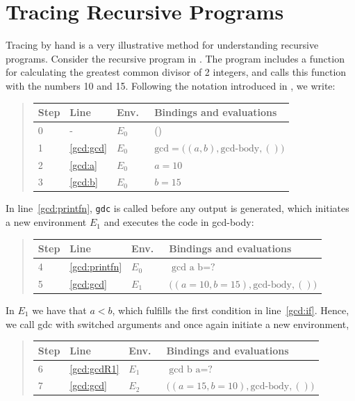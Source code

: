 \documentclass[springer.tex]{subfiles}
\begin{document}
\section{Tracing Recursive Programs}
\label{sec:recursiveTracing}
Tracing by hand is a very illustrative method for understanding recursive programs. Consider the recursive program in .
%
%
The program includes a function for calculating the greatest common divisor of 2 integers, and calls this function with the numbers 10 and 15. Following the notation introduced in , we write:
\begin{quote}
  \begin{tabular*}{0.6\linewidth}{l|lll}
    Step & Line & Env.\ & Bindings and evaluations\\
    \hline
    0 & - & $E_0$ & ()\\
    1 &\ref{gcd:gcd} & $E_0$ & $\text{gcd} = \big((a, b), \text{gcd-body}, ()\big)$\\
    2 &\ref{gcd:a} & $E_0$ & $a = 10$\\
    3 &\ref{gcd:b} & $E_0$ & $b = 15$\\
  \end{tabular*}
\end{quote}
In line~\ref{gcd:printfn}, \lstinline!gdc! is called before any output is generated, which initiates a new environment $E_1$ and executes the code in gcd-body:
\begin{quote}
  \begin{tabular*}{0.6\linewidth}{l|lll}
    Step & Line & Env.\ & Bindings and evaluations\\
    \hline
  4 & \ref{gcd:printfn} & $E_0$ & $\text{gcd a b} = \text{?}$\\
  5 & \ref{gcd:gcd} & $E_1$ & $\big((a = 10, b =15), \text{gcd-body}, ()\big)$\\
  \end{tabular*}
\end{quote}
 In $E_1$ we have that $a<b$, which fulfills the first condition in line~\ref{gcd:if}. Hence, we call gdc with switched arguments and once again initiate a new environment,
\begin{quote}
  \begin{tabular*}{0.6\linewidth}{l|lll}
    Step & Line & Env.\ & Bindings and evaluations\\
    \hline
  6&\ref{gcd:gcdR1} & $E_1$ &$\text{gcd b a} = \text{?}$\\
  7 &\ref{gcd:gcd} & $E_2$ & $\big((a = 15, b = 10), \text{gcd-body}, ()\big)$\\
  \end{tabular*}
\end{quote}
\end{document}

